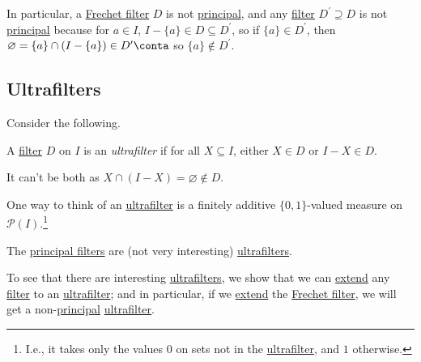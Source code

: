 In particular, a \hyperref[eg:Frechet-filter]{Frechet filter} \(D\) is not \hyperref[eg:principal-filter]{principal}, and any \hyperref[def:filter]{filter} \(D^{\prime} \supseteq D\) is not \hyperref[eg:principal-filter]{principal} because for \(a\in I\), \(I - \{a\} \in D \subseteq D^{\prime} \), so if \(\{a\} \in D^{\prime} \), then \(\varnothing = \{a\} \cap (I - \{a\}) \in D^{\prime} \conta\) so \(\{a\} \notin D^{\prime} \).


\subsection{Ultrafilters}
Consider the following.

\begin{definition}[Ultrafilter]\label{def:ultrafilter}
	A \hyperref[def:filter]{filter} \(D\) on \(I\) is an \emph{ultrafilter} if for all \(X \subseteq I\), either \(X\in D\) or \(I - X \in D\).
\end{definition}

\begin{note}
	It can't be both as \(X \cap (I - X) = \varnothing \notin D\).
\end{note}

\begin{intuition}
	One way to think of an \hyperref[def:ultrafilter]{ultrafilter} is a finitely additive \(\{0, 1\}\)-valued measure on \(\mathcal{P} (I)\).\footnote{I.e., it takes only the values \(0\) on sets not in the \hyperref[def:ultrafilter]{ultrafilter}, and \(1\) otherwise.}
\end{intuition}

\begin{eg}
	The \hyperref[eg:principal-filter]{principal filters} are (not very interesting) \hyperref[def:ultrafilter]{ultrafilters}.
\end{eg}

To see that there are interesting \hyperref[def:ultrafilter]{ultrafilters}, we show that we can \hyperref[eg:extend]{extend} any \hyperref[def:filter]{filter} to an \hyperref[def:ultrafilter]{ultrafilter}; and in particular, if we \hyperref[eg:extend]{extend} the \hyperref[eg:Frechet-filter]{Frechet filter}, we will get a non-\hyperref[eg:principal-filter]{principal} \hyperref[def:ultrafilter]{ultrafilter}.


